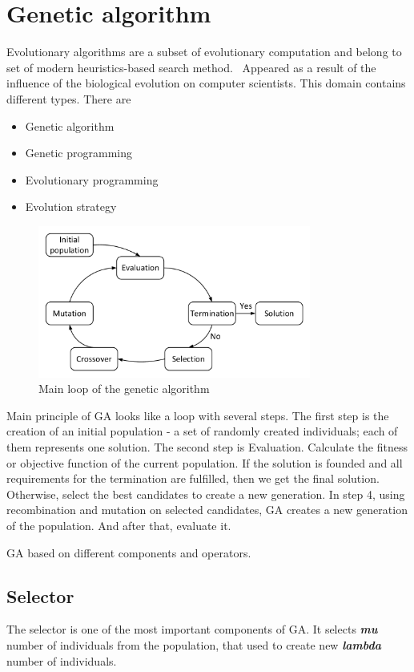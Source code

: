 \section{Genetic algorithm}
\label{sec:GeneticAlgorithm}
Evolutionary algorithms are a subset of evolutionary computation and belong to set of modern heuristics-based search method.~\cite{vikhar16}
Appeared as a result of the influence of the biological evolution on computer scientists. This domain contains different types.
There are
\begin{itemize}
	\item Genetic algorithm 
	\item Genetic programming
	\item Evolutionary programming
	\item Evolution strategy
\end{itemize}

\begin{figure}
	\centering
	\includegraphics[width=0.8\textwidth]{images/GeneticLoop}
	\caption[Main loop of the genetic algorithm]{Main loop of the genetic algorithm}
	\label{fig:GeneticLoop}
\end{figure}
Main principle of GA looks like a loop with several steps.
The first step is the creation of an initial population - a set of randomly created individuals; each of them represents one solution. 
The second step is Evaluation. Calculate the fitness or objective function of the current population.
If the solution is founded and all requirements for the termination are fulfilled, then we get the final solution. Otherwise, select the best candidates to create a new generation.
In step 4, using recombination and mutation on selected candidates, GA creates a new generation of the population. And after that, evaluate it.

GA based on different components and operators.
\subsection{Selector}\label{sec:GeneticAlgorithm:Selector}
The selector is one of the most important components of GA. It selects \textit{\textbf{mu}} number of individuals from the population, that used to create new \textit{\textbf{lambda}} number of individuals.

